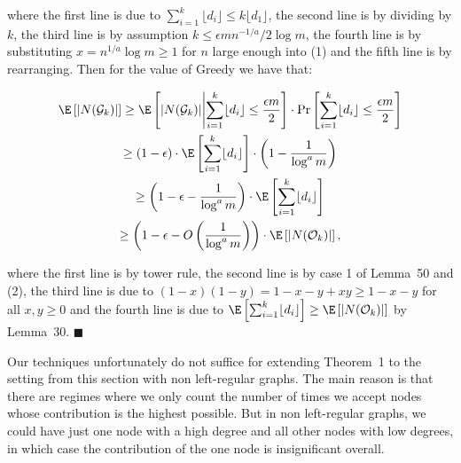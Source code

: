 where the first line is due to $\sum_{i=1}^{k}\lfloor d_{i}\rfloor\leq k\lfloor d_{1}\rfloor$, the second line is by dividing by $k$, the third line is by assumption $k\leq\epsilon mn^{-1/a}/2\log{m}$, the fourth line is by substituting $x=n^{1/a}\log{m}\geq 1$ for $n$ large enough into (1) and the fifth line is by rearranging.
Then for the value of Greedy we have that:\par


\[\begin{gathered}
\displaystyle\E\left[|N(\mathcal{G}_{k})|\right] \displaystyle\geq\E\left[|N(\mathcal{G}_{k})|\middle|\sum_{i=1}^{k}\lfloor d_{i}\rfloor\leq\frac{\epsilon m}{2}\right]\cdot\Pr\left[\sum_{i=1}^{k}\lfloor d_{i}\rfloor\leq\frac{\epsilon m}{2}\right] \\
\displaystyle\geq(1-\epsilon)\cdot\E\left[\sum_{i=1}^{k}\lfloor d_{i}\rfloor\right]\cdot\left(1-\frac{1}{\log^{a}{m}}\right) \\
\displaystyle\geq\left(1-\epsilon-\frac{1}{\log^{a}{m}}\right)\cdot\E\left[\sum_{i=1}^{k}\lfloor d_{i}\rfloor\right] \\
\displaystyle\geq\left(1-\epsilon-O\left(\frac{1}{\log^{a}{m}}\right)\right)\cdot\E\left[|N(\mathcal{O}_{k})|\right],
\end{gathered}\]


where the first line is by tower rule, the second line is by case 1 of Lemma 50 and (2), the third line is due to $(1-x)(1-y)=1-x-y+xy\geq 1-x-y$ for all $x,y\geq 0$ and the fourth line is due to $\E\left[\sum_{i=1}^{k}\lfloor d_{i}\rfloor\right]\geq\E\left[|N(\mathcal{O}_{k})|\right]$ by Lemma 30.
\ensuremath{\blacksquare}\par





Our techniques unfortunately do not suffice for extending Theorem 1 to the setting from this section with non left-regular graphs. The main reason is that there are regimes where we only count the number of times we accept nodes
whose contribution is the highest possible. But in non left-regular graphs, we could have
just one node with a high degree and all other nodes with low degrees, in which case the
contribution of the one node is insignificant overall.\par




